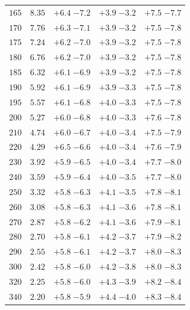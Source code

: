 \begin{table}
\begin{center}
\begin{tabular}{ccccc}
$ 165  $&$  8.35 $& $ {+ 6.4}  \;{- 7.2} $ & $ {+ 3.9}  \;{- 3.2} $ & $ {+ 7.5}  \;{- 7.7} $ \\
$ 170  $&$  7.76 $& $ {+ 6.3}  \;{- 7.1} $ & $ {+ 3.9}  \;{- 3.2} $ & $ {+ 7.5}  \;{- 7.8} $ \\
$ 175  $&$  7.24 $& $ {+ 6.2}  \;{- 7.0} $ & $ {+ 3.9}  \;{- 3.2} $ & $ {+ 7.5}  \;{- 7.8} $ \\
$ 180  $&$  6.76 $& $ {+ 6.2}  \;{- 7.0} $ & $ {+ 3.9}  \;{- 3.2} $ & $ {+ 7.5}  \;{- 7.8} $ \\
$ 185  $&$  6.32 $& $ {+ 6.1}  \;{- 6.9} $ & $ {+ 3.9}  \;{- 3.2} $ & $ {+ 7.5}  \;{- 7.8} $ \\
$ 190  $&$  5.92 $& $ {+ 6.1}  \;{- 6.9} $ & $ {+ 3.9}  \;{- 3.3} $ & $ {+ 7.5}  \;{- 7.8} $ \\
$ 195  $&$  5.57 $& $ {+ 6.1}  \;{- 6.8} $ & $ {+ 4.0}  \;{- 3.3} $ & $ {+ 7.5}  \;{- 7.8} $ \\
$ 200  $&$  5.27 $& $ {+ 6.0}  \;{- 6.8} $ & $ {+ 4.0}  \;{- 3.3} $ & $ {+ 7.6}  \;{- 7.8} $ \\
$ 210  $&$  4.74 $& $ {+ 6.0}  \;{- 6.7} $ & $ {+ 4.0}  \;{- 3.4} $ & $ {+ 7.5}  \;{- 7.9} $ \\
$ 220  $&$  4.29 $& $ {+ 6.5}  \;{- 6.6} $ & $ {+ 4.0}  \;{- 3.4} $ & $ {+ 7.6}  \;{- 7.9} $ \\
$ 230  $&$  3.92 $& $ {+ 5.9}  \;{- 6.5} $ & $ {+ 4.0}  \;{- 3.4} $ & $ {+ 7.7}  \;{- 8.0} $ \\
$ 240  $&$  3.59 $& $ {+ 5.9}  \;{- 6.4} $ & $ {+ 4.0}  \;{- 3.5} $ & $ {+ 7.7}  \;{- 8.0} $ \\
$ 250  $&$  3.32 $& $ {+ 5.8}  \;{- 6.3} $ & $ {+ 4.1}  \;{- 3.5} $ & $ {+ 7.8}  \;{- 8.1} $ \\
$ 260  $&$  3.08 $& $ {+ 5.8}  \;{- 6.3} $ & $ {+ 4.1}  \;{- 3.6} $ & $ {+ 7.8}  \;{- 8.1} $ \\
$ 270  $&$  2.87 $& $ {+ 5.8}  \;{- 6.2} $ & $ {+ 4.1}  \;{- 3.6} $ & $ {+ 7.9}  \;{- 8.1} $ \\
$ 280  $&$  2.70 $& $ {+ 5.8}  \;{- 6.1} $ & $ {+ 4.2}  \;{- 3.7} $ & $ {+ 7.9}  \;{- 8.2} $ \\
$ 290  $&$  2.55 $& $ {+ 5.8}  \;{- 6.1} $ & $ {+ 4.2}  \;{- 3.7} $ & $ {+ 8.0}  \;{- 8.3} $ \\
$ 300  $&$  2.42 $& $ {+ 5.8}  \;{- 6.0} $ & $ {+ 4.2}  \;{- 3.8} $ & $ {+ 8.0}  \;{- 8.3} $ \\
$ 320  $&$  2.25 $& $ {+ 5.8}  \;{- 6.0} $ & $ {+ 4.3}  \;{- 3.9} $ & $ {+ 8.2}  \;{- 8.4} $ \\
$ 340  $&$  2.20 $& $ {+ 5.8}  \;{- 5.9} $ & $ {+ 4.4}  \;{- 4.0} $ & $ {+ 8.3}  \;{- 8.4} $ \\

\end{tabular}
\end{center}
\end{table}
